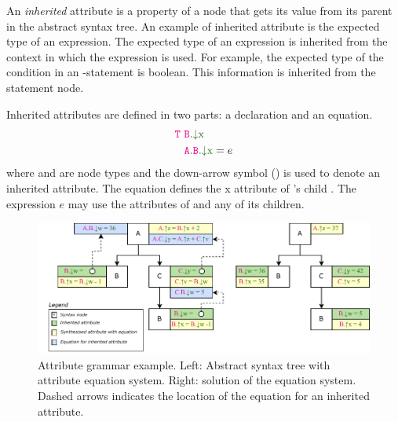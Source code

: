 
An \emph{inherited} attribute is a property of a node that gets its value from
its parent in the abstract syntax tree.
An example of inherited attribute is the expected type of an expression.
The expected type of an expression is inherited from the context in which the expression is used.
For example, the expected type of the condition in an -statement is boolean.
This information is inherited from the  statement node.

Inherited attributes are defined in two parts: a declaration and an equation.
\begin{align*}
 \astnode{T} \ &\Ainh{B}{x} \\
 &\Ainhdef{A}{B}{x} = e
\end{align*}
where  and  are node types and the down-arrow symbol (\textcolor{ATGsym}{\mInh{}}) is used to denote an inherited attribute.
The equation defines the \textcolor{ATGsym}{x} attribute of 's child .
The expression $e$ may use the attributes of  and any of its children.


\begin{figure}
\centering
\includegraphics[width=1\textwidth]{kappa/img/AGExample.pdf}
    \caption{\label{fig:ragsExample} Attribute grammar example.
    Left: Abstract syntax tree with attribute equation system. Right: solution of the equation system.
    Dashed arrows indicates the location of the equation for an inherited attribute.
    }
\end{figure}

